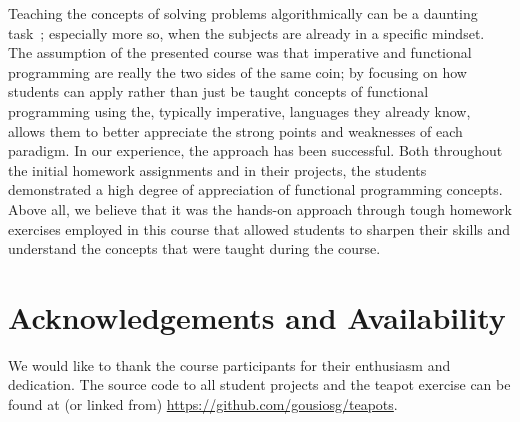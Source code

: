 \documentclass[conference]{IEEEtran}
\begin{document}
Teaching the concepts of solving problems algorithmically can be a daunting
task~\cite{Futsc06}; especially more so, when the subjects are already in a
specific mindset. The assumption of the presented course was that imperative and
functional programming are really the two sides of the same coin; by focusing on
how students can apply rather than just be taught concepts of functional
programming using the, typically imperative, languages they already know, allows
them to better appreciate the strong points and weaknesses of each paradigm. In
our experience, the approach has been successful. Both throughout the initial
homework assignments and in their projects, the students demonstrated a high
degree of appreciation of functional programming concepts. Above all, we
believe that it was the hands-on approach through tough homework exercises
employed in this course that allowed students to sharpen their skills and
understand the concepts that were taught during the course.

\section*{Acknowledgements and Availability}

We would like to thank the course participants for their enthusiasm and
dedication. The source code to all student projects and the teapot
exercise can be found at (or linked from) \url{https://github.com/gousiosg/teapots}. 



\end{document}
